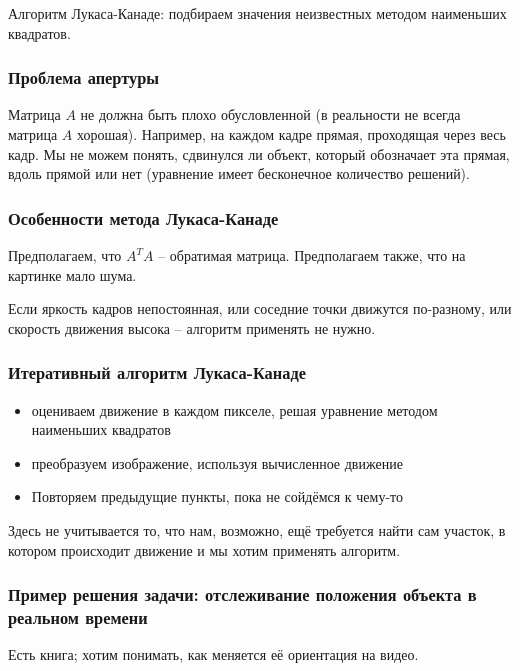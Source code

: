 \documentclass[main.tex]{subfiles}
\begin{document}
Алгоритм Лукаса-Канаде: подбираем значения неизвестных методом наименьших квадратов.

\subsubsection{Проблема апертуры}

Матрица $ A $ не должна быть плохо обусловленной (в реальности не всегда матрица $ A $ хорошая).
Например, на каждом кадре прямая, проходящая через весь кадр.
Мы не можем понять, сдвинулся ли объект, который обозначает эта прямая, вдоль прямой или нет (уравнение имеет бесконечное количество решений).

\subsubsection{Особенности метода Лукаса-Канаде}

Предполагаем, что $ A^TA $ -- обратимая матрица.
Предполагаем также, что на картинке мало шума.

Если яркость кадров непостоянная, или соседние точки движутся по-разному, или скорость движения высока -- алгоритм применять не нужно.

\subsubsection{Итеративный алгоритм Лукаса-Канаде}

\begin{itemize}[noitemsep]
    \item оцениваем движение в каждом пикселе, решая уравнение методом наименьших квадратов
    \item преобразуем изображение, используя вычисленное движение %
    \item Повторяем предыдущие пункты, пока не сойдёмся к чему-то
\end{itemize}

Здесь не учитывается то, что нам, возможно, ещё требуется найти сам участок, в котором происходит движение и мы хотим применять алгоритм.

\subsubsection{Пример решения задачи: отслеживание положения объекта в реальном времени}

Есть книга; хотим понимать, как меняется её ориентация на видео.
\end{document}
